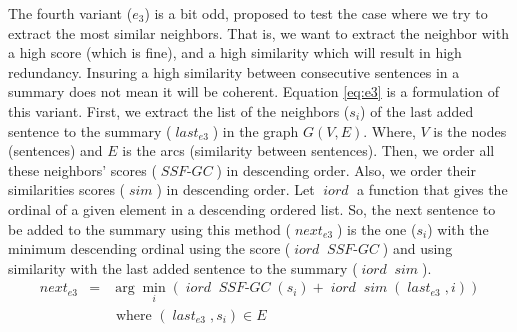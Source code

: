 \documentclass[12pt, oneside, a4paper]{article}
\DeclareMathOperator{\ssfgc}{\textit{SSF-GC}}
\DeclareMathOperator{\iord}{\textit{iord}}
\DeclareMathOperator{\simil}{\textit{sim}}
\DeclareMathOperator{\nextsent}{\textit{next}}
\DeclareMathOperator{\lastsent}{\textit{last}}
\begin{document}
The fourth variant ($ e_3 $) is a bit odd, proposed to test the case where we try to extract the most similar neighbors.
That is, we want to extract the neighbor with a high score (which is fine), and a high similarity which will result in high redundancy.
Insuring a high similarity between consecutive sentences in a summary does not mean it will be coherent. 
Equation \ref{eq:e3} is a formulation of this variant.
First, we extract the list of the neighbors ($s_i$) of the last added sentence to the summary ($\lastsent_{e3}$) in the graph $ G(V, E) $.
Where, $ V $ is the nodes (sentences) and $ E $ is the arcs (similarity between sentences). 
Then, we order all these neighbors' scores ($\ssfgc$) in descending order. 
Also, we order their similarities scores ($\simil$) in descending order. 
Let $ \iord $ a function that gives the ordinal of a given element in a descending ordered list.
So, the next sentence to be added to the summary using this method ($\nextsent_{e3}$) is the one ($s_i$) with the minimum descending ordinal using the score ($\iord\ssfgc$) and using similarity with the last added sentence to the summary ($\iord\simil$).
\begin{equation}
\begin{aligned}
\nextsent_{e3} & = & \arg\min\limits_i (\iord\ssfgc(s_i) + \iord\simil(\lastsent_{e3}, i)) \\
&& \text{ where } (\lastsent_{e3}, s_i) \in E \\
\end{aligned}
\label{eq:e3}
\end{equation}
\end{document}
